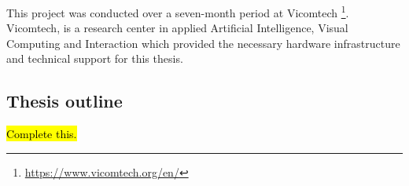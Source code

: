 This project was conducted over a seven-month period at Vicomtech  \footnote{\url{https://www.vicomtech.org/en/}}. Vicomtech, is a research center in applied Artificial Intelligence, Visual Computing and Interaction which provided the necessary hardware infrastructure and technical support for this thesis.

\subsection{Thesis outline}
\hl{Complete this.}
